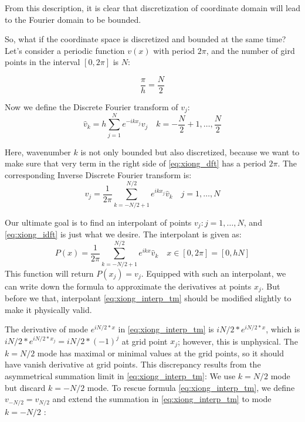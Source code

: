 From this description, it is clear that discretization of coordinate
domain will lead to the Fourier domain to be bounded.

So, what if the coordinate space is discretized and bounded at the same time? Let's
consider a periodic function $v(x)$ with period $2\pi$, and the number of gird points in
the interval $[0,2\pi]$ is $N$:

\begin{equation}
 \frac{\pi}{h}=\frac{N}{2}
\end{equation}

Now we define the Discrete Fourier transform of $v_{j}$:
\begin{equation}
\label{eq:xiong_dft}
 \hat{v}_{k}=h\sum_{j=1}^{N}e^{-ikx_{j}}v_{j} \quad k=-\frac{N}{2}+1,\dots ,\frac{N}{2}
\end{equation}

Here, wavenumber $k$ is not only bounded but also discretized, because we want to make
sure that very term in the right side of \eqref{eq:xiong_dft} has a period $2\pi$.
The corresponding Inverse Discrete Fourier transform is:
\begin{equation}
\label{eq:xiong_idft}
 v_{j}=\frac{1}{2\pi}\sum_{k=-N/2+1}^{N/2}e^{ikx_{j}}\hat{v}_{k} \quad j=1,\dots ,N
\end{equation}

Our ultimate goal is to find an interpolant of points ${v_{j}:j=1,\dots ,N}$, and
\eqref{eq:xiong_idft} is just what we desire. The interpolant is given as:
\begin{equation}
\label{eq:xiong_interp_tm}
 P(x)=\frac{1}{2\pi}\sum_{k=-N/2+1}^{N/2}e^{ikx}\hat{v}_{k} \quad
 x\in [0,2\pi]=[0,hN]
\end{equation}
This function will return $P(x_{j})=v_{j}$. Equipped with such an interpolant, we can
write down the formula to approximate the derivatives at points ${x_{j}}$. But before
we that, interpolant \eqref{eq:xiong_interp_tm} should be modified slightly
to make it physically valid.

The derivative of mode $e^{iN/2*x}$ in \eqref{eq:xiong_interp_tm} is $iN/2*e^{iN/2*x}$,
which is $iN/2*e^{iN/2*x_{j}}=iN/2*(-1)^{j}$ at grid point $x_{j}$; however, this is
unphysical. The $k=N/2$ mode has maximal or minimal values at
the grid points, so it should have vanish derivative at grid points. This discrepancy
results from the asymmetrical summation limit in \eqref{eq:xiong_interp_tm}:
We use $k=N/2$ mode but discard $k=-N/2$ mode. To rescue formula
\eqref{eq:xiong_interp_tm}, we define $v_{-N/2}=v_{N/2}$ and extend the summation in
\eqref{eq:xiong_interp_tm} to mode $k=-N/2$ :

